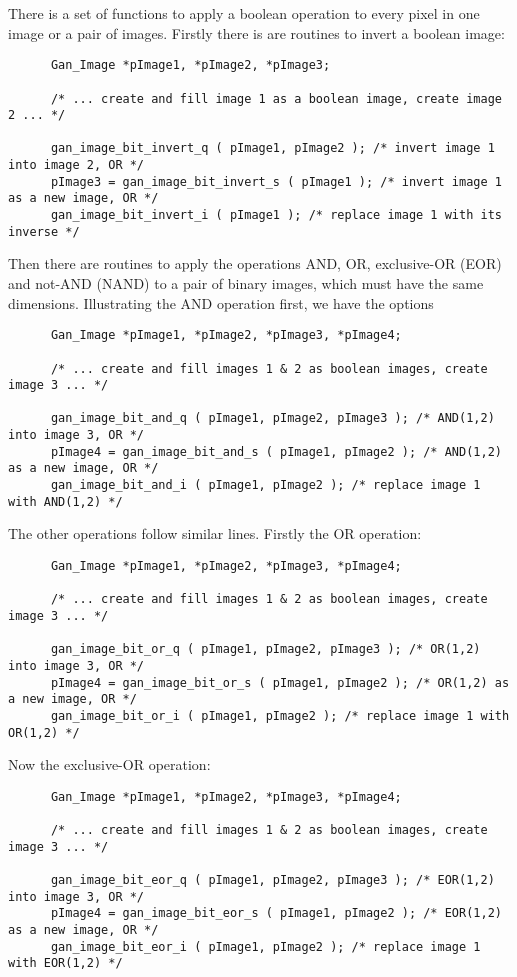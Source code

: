 There is a set of functions to apply a boolean operation to every pixel
in one image or a pair of images. Firstly there is are routines to invert
a boolean image:
\begin{verbatim}
      Gan_Image *pImage1, *pImage2, *pImage3;

      /* ... create and fill image 1 as a boolean image, create image 2 ... */

      gan_image_bit_invert_q ( pImage1, pImage2 ); /* invert image 1 into image 2, OR */
      pImage3 = gan_image_bit_invert_s ( pImage1 ); /* invert image 1 as a new image, OR */
      gan_image_bit_invert_i ( pImage1 ); /* replace image 1 with its inverse */
\end{verbatim}
Then there are routines to apply the operations AND, OR, exclusive-OR (EOR) and
not-AND (NAND) to a pair of binary images, which must have the same dimensions.
Illustrating the AND operation first, we have the options
\begin{verbatim}
      Gan_Image *pImage1, *pImage2, *pImage3, *pImage4;

      /* ... create and fill images 1 & 2 as boolean images, create image 3 ... */

      gan_image_bit_and_q ( pImage1, pImage2, pImage3 ); /* AND(1,2) into image 3, OR */
      pImage4 = gan_image_bit_and_s ( pImage1, pImage2 ); /* AND(1,2) as a new image, OR */
      gan_image_bit_and_i ( pImage1, pImage2 ); /* replace image 1 with AND(1,2) */
\end{verbatim}
The other operations follow similar lines. Firstly the OR operation:
\begin{verbatim}
      Gan_Image *pImage1, *pImage2, *pImage3, *pImage4;

      /* ... create and fill images 1 & 2 as boolean images, create image 3 ... */

      gan_image_bit_or_q ( pImage1, pImage2, pImage3 ); /* OR(1,2) into image 3, OR */
      pImage4 = gan_image_bit_or_s ( pImage1, pImage2 ); /* OR(1,2) as a new image, OR */
      gan_image_bit_or_i ( pImage1, pImage2 ); /* replace image 1 with OR(1,2) */
\end{verbatim}
Now the exclusive-OR operation:
\begin{verbatim}
      Gan_Image *pImage1, *pImage2, *pImage3, *pImage4;

      /* ... create and fill images 1 & 2 as boolean images, create image 3 ... */

      gan_image_bit_eor_q ( pImage1, pImage2, pImage3 ); /* EOR(1,2) into image 3, OR */
      pImage4 = gan_image_bit_eor_s ( pImage1, pImage2 ); /* EOR(1,2) as a new image, OR */
      gan_image_bit_eor_i ( pImage1, pImage2 ); /* replace image 1 with EOR(1,2) */
\end{verbatim}
